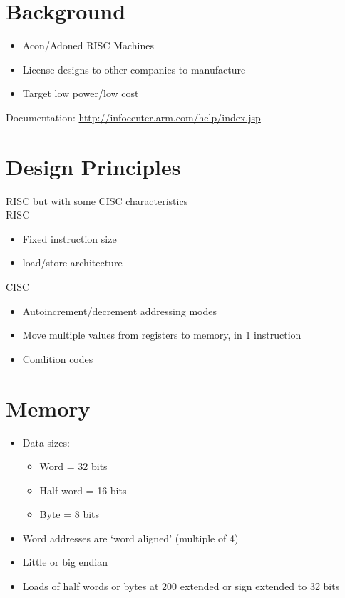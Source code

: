  \section{Background}
    \begin{itemize}
      \item Acon/Adoned RISC Machines
      \item License designs to other companies to manufacture
      \item Target low power/low cost
    \end{itemize}
    Documentation:
    \url{http://infocenter.arm.com/help/index.jsp}

  \section{Design Principles}
    RISC but with some CISC characteristics\\
    RISC\:
    \begin{itemize}
      \item Fixed instruction size
      \item load/store architecture
    \end{itemize}
    CISC\:
    \begin{itemize}
      \item Autoincrement/decrement addressing modes
      \item Move multiple values from registers to memory, in 1 instruction
      \item Condition codes
    \end{itemize}
  \section{Memory}
    \begin{itemize}
      \item Data sizes:
        \begin{itemize}
          \item Word = 32 bits
          \item Half word = 16 bits
          \item Byte = 8 bits
        \end{itemize}
      \item Word addresses are `word aligned' (multiple of 4)
      \item Little or big endian
      \item Loads of half words or bytes at  200 extended or sign extended to
        32 bits
    \end{itemize}

